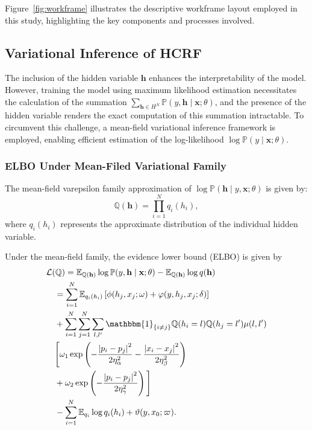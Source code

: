 \documentclass[conference]{IEEEtran}
\newcommand{\EE}{{\mathbb{E}}}
\newcommand{\hb}{\mathbf{h}}
\newcommand{\Lc}{\mathcal{L}}
\newcommand{\PP}{{\mathbb{P}}}
\newcommand{\QQ}{{\mathbb{Q}}}
\newcommand{\xb}{\mathbf{x}}
\newcommand{\one}{\mathbbm{1}}
\let\oldsubsubsection\subsubsection
\renewcommand{\subsubsection}[1]{\oldsubsubsection{\textbf{#1}}}
\begin{document}
Figure~\ref{fig:workframe} illustrates the descriptive workframe layout
employed in this study, highlighting the key components and processes involved.


\subsection{Variational Inference of HCRF}


The inclusion of the hidden variable $\hb$ enhances the interpretability of the
model. However, training the model using maximum likelihood estimation
necessitates the calculation of the summation
$\sum_{\hb \in H^N} \PP(y, \hb \mid \xb; \theta)$, and the presence of the
hidden variable renders the exact computation of this summation intractable.
To circumvent this challenge, a mean-field variational inference framework is
employed, enabling efficient estimation of the log-likelihood
$\log \PP(y \mid \xb; \theta)$.


\subsubsection{ELBO Under Mean-Filed Variational Family}


The mean-field varepsilon family approximation of
$\log \PP(\hb \mid y, \xb; \theta)$ is given by:
\begin{equation*}
\QQ(\hb) = \prod_{i=1}^N q_i(h_i),
\end{equation*}
where $q_i(h_i)$ represents the approximate distribution of the individual
hidden variable.


Under the mean-field family, the evidence lower bound (ELBO) is given by
\begin{equation}
\begin{split}
& \Lc(\QQ) = \EE_{\QQ(\hb)} \log\PP(y, \hb \mid \xb; \theta)
- \EE_{\QQ(\hb)} \log q(\hb) \\
&\quad = \sum_{i=1}^N \EE_{q_i(h_i)}
\left[ \phi(h_j, x_j; \omega) + \varphi(y, h_j, x_j; \delta) \right] \\
&\quad + \sum_{i=1}^N \sum_{j=1}^N \sum_{l,l^\prime} \one_{\{i \neq j\}} 
\QQ(h_i = l) \QQ(h_j = l^\prime) \mu(l, l^\prime) \\
&\quad \Bigg[ \omega_1 \exp \left(
- \frac{\left\lvert p_i - p_j \right\rvert^2}{2\eta_\alpha^2}
- \frac{\left\lvert x_i - x_j \right\rvert^2}{2\eta_\beta^2} \right) \\
&\quad + \omega_2 \exp \left(
- \frac{\left\lvert p_i - p_j \right\rvert^2}{2\eta_\gamma^2}
\right) \Bigg] \\
&\quad - \sum_{i=1}^N \EE_{q_i} \log q_i(h_i) + \vartheta(y, x_0; \varpi).
\end{split}
\end{equation}
\end{document}
